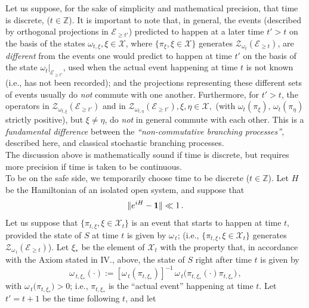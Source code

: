 \documentclass[12pt]{article}
\begin{document}
Let us suppose, for the sake of simplicity and mathematical precision, that time is discrete, ($t\in \mathbb{Z}$). It is important to note that, in general, the events (described by orthogonal projections in $\mathcal{E}_{\geq t'}$) predicted to happen at a later time $t'>t$ on the basis of the states $\omega_{t, \xi}, \xi \in \mathcal{X}$, where \mbox{$\lbrace \pi_{\xi}, \xi \in \mathcal{X} \rbrace$} generates $\mathcal{Z}_{\omega_t}(\mathcal{E}_{\geq t})$, are \textit{different} from the events one would predict to happen at time $t'$ on the basis of the state $\omega_{t}\vert_{\mathcal{E}_{\geq t'}}$, used when the actual event happening at time $t$ is not known (i.e., has not been recorded); and the projections representing these different sets of events usually do \textit{not} commute with one another. 
Furthermore, for $t'>t$, the operators in $\mathcal{Z}_{\omega_{t, \xi}}(\mathcal{E}_{\geq t'})$ and in 
$\mathcal{Z}_{\omega_{t, \eta}}(\mathcal{E}_{\geq t'}), \xi, \eta \in \mathcal{X},$ (with $\omega_{t}(\pi_{\xi}), \,\omega_{t}(\pi_{\eta})$ strictly positive), but $\xi \not= \eta$, do \textit{not} in general commute with each other. This is a \textit{fundamental difference} between the \textit{``non-commutative branching processes''}, described here, and classical stochastic branching processes.\\
The discussion above is mathematically sound if time is discrete, but requires more precision if time is taken to be continuous.\\
To be on the safe side, we temporarily choose time to be discrete ($t\in \mathbb{Z}$). Let $H$ be the Hamiltonian of an isolated open system, and suppose that 
\begin{equation} \label{H}
\Vert e^{iH} - {\bf{1}} \Vert \ll 1\,.
\end{equation}
Let us suppose that $\lbrace \pi_{t,\xi} , \xi \in \mathcal{X}_{t} \rbrace$ is an event that starts to happen at time $t$, provided the state of $S$ at time $t$ is given by $\omega_{\,t}$; (i.e., $\lbrace \pi_{t,\xi} , \xi \in \mathcal{X}_{t} \rbrace$ generates $\mathcal{Z}_{\omega_{\,t}}(\mathcal{E}_{\geq t})$). Let $\xi_{*}$ be the element of $\mathcal{X}_{t}$ with the property that, in accordance with the Axiom stated in IV., above, the state of $S$ right after time $t$ is given by 
$$\omega_{\,t, \xi_{*}}(\cdot):=[\omega_{\,t}(\pi_{t, \xi_{*}})]^{-1}\,\omega_{\,t}\big(\pi_{t, \xi_{*}} (\cdot) \pi_{t, \xi_{*}}\big)\,,$$
with $\omega_{\,t}\big( \pi_{t, \xi_{*}} \big) > 0$; i.e., $\pi_{t,\xi_{*}}$ is the ``actual event'' happening at time $t$. Let $t' = t+1$ be the time following $t$, and let 
\end{document}
